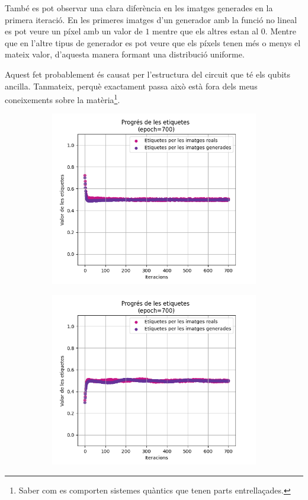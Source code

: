 També es pot observar una clara diferència en les imatges generades en la primera iteració. En les primeres imatges d'un generador amb la funció no lineal es pot veure un píxel amb un valor de $1$ mentre que els altres estan al $0$. Mentre que en l'altre tipus de generador es pot veure que els píxels tenen més o menys el mateix valor, d'aquesta manera formant una distribució uniforme. 

Aquest fet probablement és causat per l'estructura del circuit que té els qubits ancilla. Tanmateix, perquè exactament passa això està fora dels meus coneixements sobre la matèria\footnote{Saber com es comporten sistemes quàntics que tenen parts entrellaçades.}.

\begin{figure}[H]
	\begin{subfigure}[b]{.32\linewidth}
		\includegraphics[width=\linewidth]{figures/data/L_4.png}
		\caption{}
	\end{subfigure}
	\begin{subfigure}[b]{.32\linewidth}
		\includegraphics[width=\linewidth]{figures/data/L_5.png}

\end{subfigure}
\end{figure}
